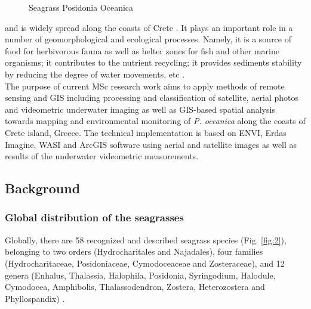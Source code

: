 \documentclass[10pt, a4paper]{article}
\begin{document}
\begin{figure}[h]
	\centering
	\hspace{2mm}
	\caption{Seagrass Posidonia Oceanica}
	\label{fig:1}
\end{figure}

and is widely spread along the coasts of Crete \cite{Dumay02} \label{Dumay02}. 
It plays an important role in a number
of geomorphological and ecological processes. Namely, it is a source of food for herbivorous fauna as
well as helter zones for fish and other marine organisms; it contributes to the nutrient recycling; it
provides sediments stability by reducing the degree of water movements, etc \cite{Francour99}\label{Francour99}.\\
The purpose of current MSc research work aims to apply methods of remote sensing and GIS
including processing and classification of satellite, aerial photos and videometric underwater imaging
as well as GIS-based spatial analysis towards mapping and environmental monitoring of \emph{P. oceanica}
along the coasts of Crete island, Greece. The technical implementation is based on ENVI, Erdas
Imagine, WASI and ArcGIS software using aerial and satellite images as well as results of the
underwater videometric measurements.

\subsection{Background}
\subsubsection{Global distribution of the seagrasses}
Globally, there are 58 recognized and described seagrass species (Fig. \ref{fig:2}), belonging to two orders
(Hydrocharitales and Najadales), four families (Hydrocharitaceae, Posidoniaceae, Cymodoceaceae
and Zosteraceae), and 12 genera (Enhalus, Thalassia, Halophila, Posidonia, Syringodium, Halodule,
Cymodocea, Amphibolis, Thalassodendron, Zostera, Heterozostera and Phyllospandix) \cite{Kuo89}\label{Kuo89}.
\end{document}
